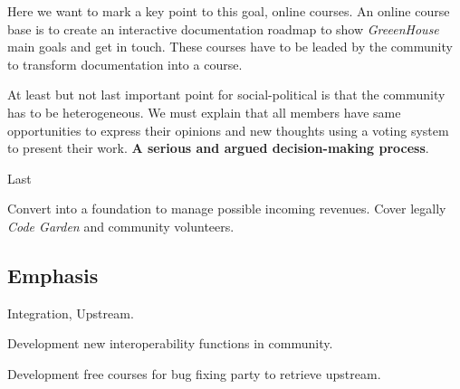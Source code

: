 \documentclass[11pt]{scrartcl}
\begin{document}
\par Here we want to mark a key point to this goal, online courses. An online course base is to create an interactive documentation roadmap to show \emph{GreeenHouse} main goals and get in touch. These courses have to be leaded by the community to transform documentation into a course.

\par At least but not last important point for social-political is that the community has to be heterogeneous. We must explain that all members have same opportunities to express their opinions and new thoughts using a voting system to present their work. \textbf{A serious and argued decision-making process}.

\par Last 
\par Convert into a foundation to manage possible incoming revenues. Cover legally \emph{Code Garden} and community volunteers.


\subsection{Emphasis}
\label{sub:emphasis}

\par Integration, Upstream.

\par Development new interoperability functions in community.
\par Development free courses for bug fixing party to retrieve upstream.


\end{document}
